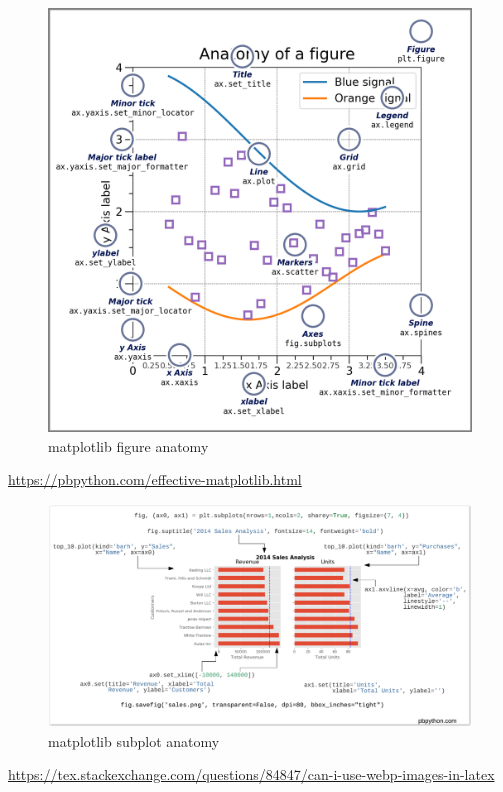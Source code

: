 \documentclass[
]{book}
\theoremstyle{definition}
\theoremstyle{definition}
\theoremstyle{definition}
\theoremstyle{definition}
\theoremstyle{remark}
\begin{document}
\begin{figure}
\includegraphics[width=1\linewidth]{img/matplotlib-figure-anatomy} \caption{matplotlib figure anatomy}\label{fig:matplotlib-figure-anatomy}
\end{figure}

\url{https://pbpython.com/effective-matplotlib.html}

\begin{figure}
\includegraphics[width=1\linewidth]{img/matplotlib-subplot-anatomy} \caption{matplotlib subplot anatomy}\label{fig:unnamed-chunk-1}
\end{figure}

\url{https://tex.stackexchange.com/questions/84847/can-i-use-webp-images-in-latex}
\end{document}
